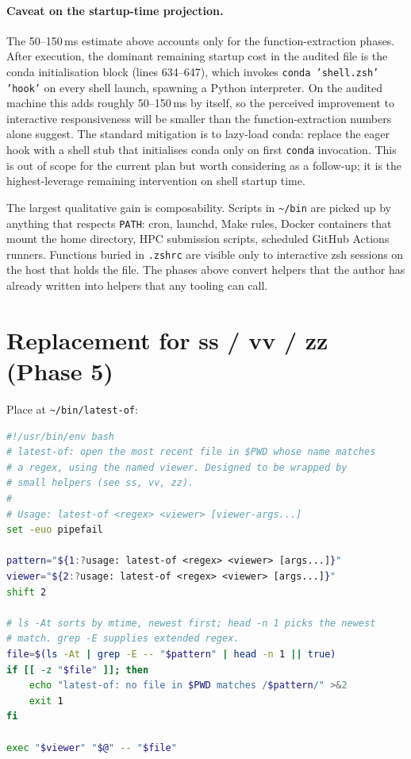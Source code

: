 \documentclass[11pt,letterpaper]{scrartcl}
\begin{document}
\paragraph{Caveat on the startup-time projection.} The 50--150\,ms
estimate above accounts only for the function-extraction phases.
After execution, the dominant remaining startup cost in the
audited file is the conda initialisation block (lines 634--647),
which invokes \texttt{conda 'shell.zsh' 'hook'} on every shell
launch, spawning a Python interpreter. On the audited machine
this adds roughly 50--150\,ms by itself, so the perceived
improvement to interactive responsiveness will be smaller than
the function-extraction numbers alone suggest. The standard
mitigation is to lazy-load conda: replace the eager hook with a
shell stub that initialises conda only on first \texttt{conda}
invocation. This is out of scope for the current plan but worth
considering as a follow-up; it is the highest-leverage remaining
intervention on shell startup time.

The largest qualitative gain is composability. Scripts in
\texttt{\textasciitilde/bin} are picked up by anything that
respects \texttt{PATH}: cron, launchd, Make rules, Docker
containers that mount the home directory, HPC submission
scripts, scheduled GitHub Actions runners. Functions buried in
\texttt{.zshrc} are visible only to interactive zsh sessions on
the host that holds the file. The phases above convert helpers
that the author has already written into helpers that any
tooling can call.

\appendix

\section{Replacement for ss / vv / zz (Phase 5)}

Place at \texttt{\textasciitilde/bin/latest-of}:

\begin{lstlisting}[language=bash]
#!/usr/bin/env bash
# latest-of: open the most recent file in $PWD whose name matches
# a regex, using the named viewer. Designed to be wrapped by
# small helpers (see ss, vv, zz).
#
# Usage: latest-of <regex> <viewer> [viewer-args...]
set -euo pipefail

pattern="${1:?usage: latest-of <regex> <viewer> [args...]}"
viewer="${2:?usage: latest-of <regex> <viewer> [args...]}"
shift 2

# ls -At sorts by mtime, newest first; head -n 1 picks the newest
# match. grep -E supplies extended regex.
file=$(ls -At | grep -E -- "$pattern" | head -n 1 || true)
if [[ -z "$file" ]]; then
    echo "latest-of: no file in $PWD matches /$pattern/" >&2
    exit 1
fi

exec "$viewer" "$@" -- "$file"
\end{lstlisting}
\end{document}
